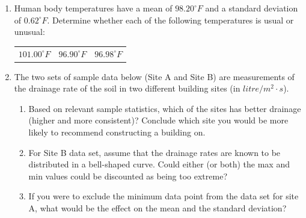 \documentclass[
]{article}
\newcounter{none} %
\providecommand{\tightlist}{%
  \setlength{\itemsep}{0pt}\setlength{\parskip}{0pt}}
\begin{document}
\begin{enumerate}
  \begin{enumerate}
  \def\labelenumii{\alph{enumii}.}
  \item
    Use Chebyshev's Rule to determine the minimum percentage of scores
    that lie between 17\% and 19\%.
  \item
    Repeat question a. using the ``Empirical Rule''.
  \item
    Use the Empirical Rule to estimate the percentage of values greater
    than 19.5\%.
  \item
    Use the Empirical Rule to estimate the percentage of values between
    18\% and 18.5\%.
  \item
    Building specifications require that the moisture content be under
    19\% to be closed in. Use the Empirical Rule to estimate the
    percentage of 4x4's that are suitable to be closed in.
  \end{enumerate}
\item
  Human body temperatures have a mean of \(98.20 ^\circ F\) and a
  standard deviation of \(0.62 ^\circ F\). Determine whether each of the
  following temperatures is usual or unusual:

  {\def\LTcaptype{none} %
  \begin{longtable}[]{@{}lll@{}}
  \toprule\noalign{}
  \endhead
  \bottomrule\noalign{}
  \endlastfoot
  \(101.00 ^\circ F\) & \(96.90 ^\circ F\) & \(96.98 ^\circ F\) \\
  \end{longtable}
  }
\item
  The two sets of sample data below (Site A and Site B) are measurements
  of the drainage rate of the soil in two different building sites (in
  \(litre / m^2\cdot s\)).

  \begin{enumerate}
  \def\labelenumii{\alph{enumii}.}
  \tightlist
  \item
    Based on relevant sample statistics, which of the sites has better
    drainage (higher and more consistent)? Conclude which site you would
    be more likely to recommend constructing a building on.
  \item
    For Site B data set, assume that the drainage rates are known to be
    distributed in a bell-shaped curve. Could either (or both) the max
    and min values could be discounted as being too extreme?
  \item
    If you were to exclude the minimum data point from the data set for
    site A, what would be the effect on the mean and the standard
    deviation?
  \end{enumerate}


\end{enumerate}
\end{document}
